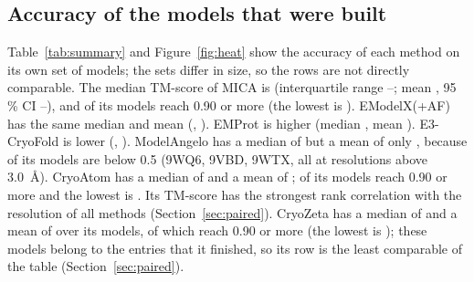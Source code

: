 \begin{table}[t]
\centering\small
\caption{Completion. \emph{Model scored}: the run ended with a model file that was scored. \emph{Failed}: crash, kill by the system or timeout. The last two columns divide by the 20 entries and by the entries on which the method was run (all 20).}
\label{tab:completion}
\fitwidth{}
\end{table}

\subsection{Accuracy of the models that were built}
Table~\ref{tab:summary} and Figure~\ref{fig:heat} show the accuracy of each method on its own set of models; the sets differ in size, so the rows are not directly comparable. The median TM-score of MICA is \TmMedMica{} (interquartile range \TmQoneMica{}--\TmQthreeMica{}; mean \TmMeanMica{}, 95\,\% CI \TmLoMica{}--\TmHiMica{}), and \NTmGeNinetyMica{} of its \NModelMica{} models reach 0.90 or more (the lowest is \TmMinMica{}). EModelX(+AF) has the same median and mean (\TmMedEmodelx{}, \TmMeanEmodelx{}). EMProt is higher (median \TmMedEmprot{}, mean \TmMeanEmprot{}). E3-CryoFold is lower (\TmMedEthree{}, \TmMeanEthree{}). ModelAngelo has a median of \TmMedAngelo{} but a mean of only \TmMeanAngelo{}, because \NTmLtHalfAngelo{} of its models are below 0.5 (9WQ6, 9VBD, 9WTX, all at resolutions above 3.0~\AA{}). CryoAtom has a median of \TmMedCryoatom{} and a mean of \TmMeanCryoatom{}; \NTmGeNinetyCryoatom{} of its \NModelCryoatom{} models reach 0.90 or more and the lowest is \TmMinCryoatom{}. Its TM-score has the strongest rank correlation with the resolution of all methods (Section~\ref{sec:paired}). CryoZeta has a median of \TmMedCryozeta{} and a mean of \TmMeanCryozeta{} over its \NModelCryozeta{} models, of which \NTmGeNinetyCryozeta{} reach 0.90 or more (the lowest is \TmMinCryozeta{}); these models belong to the entries that it finished, so its row is the least comparable of the table (Section~\ref{sec:paired}).

\begin{table}[t]
\centering\small
\caption{TM-score and three other measures of the scored models of each method (all entries). Medians for the C$\alpha$ match, coverage and C$\alpha$ quality; the other measures are in Table~\ref{tab:allmetrics}. $n$ is the number of scored models.}
\label{tab:summary}
\fitwidth{}
\end{table}

